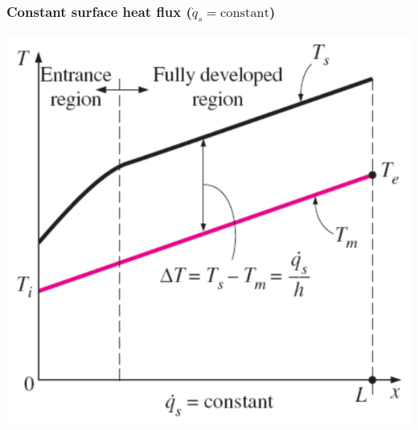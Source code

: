 \documentclass[11pt]{article}
\begin{document}
\subsubsection{Constant surface heat flux (\(\dot{q}_s = \text{constant}\))}
\label{sec:org61b6ad0}
\begin{center}
\includegraphics[width=.9\linewidth]{./images/constant-surface-heat-flux-graph.png}
\end{center}
\end{document}
